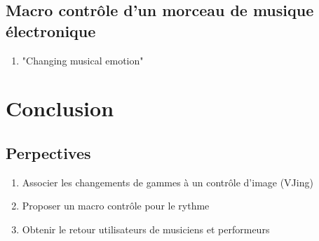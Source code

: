 \documentclass[french,11pt]{article}
\begin{document}
\subsection{Macro contrôle d'un morceau de musique électronique}
\begin{enumerate}
  \item "Changing musical emotion"
\end{enumerate}

\section{Conclusion}
\subsection{Perpectives}
\begin{enumerate}
  \item Associer les changements de gammes à un contrôle d'image (VJing)
  \item Proposer un macro contrôle pour le rythme
  \item Obtenir le retour utilisateurs de musiciens et performeurs
\end{enumerate}
\newpage
\printbibliography
\end{document}
